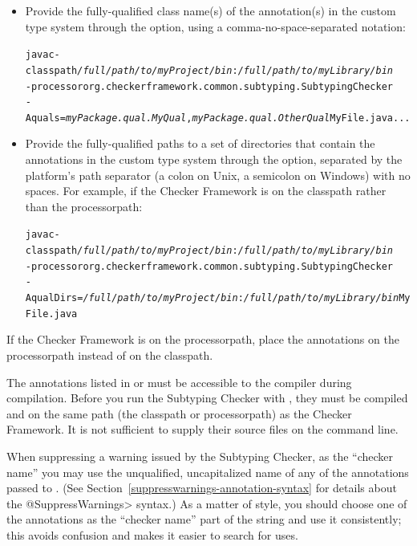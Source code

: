 \begin{itemize}

\item
Provide the fully-qualified class name(s) of the annotation(s) in the custom
type system through the  option, using a comma-no-space-separated
notation:

\begin{alltt}
  javac -classpath \textit{/full/path/to/myProject/bin}:\textit{/full/path/to/myLibrary/bin} \ttbs
        -processor org.checkerframework.common.subtyping.SubtypingChecker \ttbs
        -Aquals=\textit{myPackage.qual.MyQual},\textit{myPackage.qual.OtherQual} MyFile.java ...
\end{alltt}

\item
Provide the fully-qualified paths to a set of directories that contain the
annotations in the custom type system through the  option,
separated by the platform's path separator (a colon on Unix, a semicolon
on Windows) with no spaces. For example,
if the Checker Framework is on the classpath rather than the processorpath:

\begin{alltt}
  javac -classpath \textit{/full/path/to/myProject/bin}:\textit{/full/path/to/myLibrary/bin} \ttbs
        -processor org.checkerframework.common.subtyping.SubtypingChecker \ttbs
        -AqualDirs=\textit{/full/path/to/myProject/bin}:\textit{/full/path/to/myLibrary/bin} MyFile.java
\end{alltt}

\end{itemize}

If the Checker Framework is on the processorpath, place the annotations on
the processorpath instead of on the classpath.



The annotations listed in  or  must be accessible to
the compiler during compilation.  Before you run the Subtyping Checker with
, they must be compiled and on the same path (the classpath or
processorpath) as the Checker Framework.  It
is not sufficient to supply their source files on the command line.



When suppressing a warning issued by the Subtyping Checker, as the
``checker name'' you may use the unqualified, uncapitalized name of any of
the annotations passed to .  (See
Section~\ref{suppresswarnings-annotation-syntax} for details about the
\<@SuppressWarnings> syntax.)  As a matter of style, you should
choose one of the annotations as the ``checker name'' part of the
 string and use it consistently; this avoids
confusion and makes it easier to search for uses.


